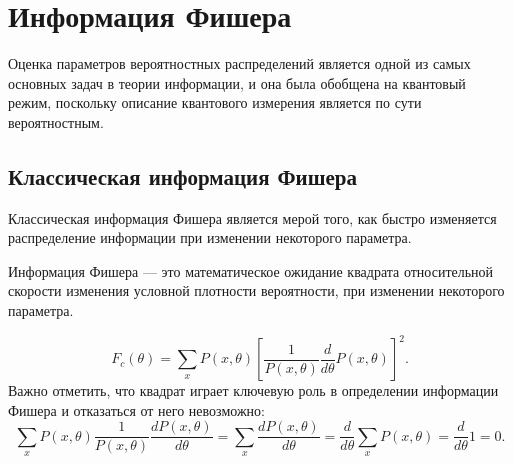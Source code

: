 \section{Информация Фишера}

Оценка параметров вероятностных распределений является одной из самых основных задач в теории информации,
и она была обобщена на квантовый режим\cite{Helstrom1969, Holevo2011}, поскольку описание квантового измерения является по сути вероятностным.

\subsection{Классическая информация Фишера}
Классическая информация Фишера является мерой того,
как быстро изменяется распределение информации при изменении некоторого параметра.

\begin{definition}\label{def:fisher-information}
 Информация Фишера --- это математическое ожидание квадрата относительной скорости изменения условной плотности вероятности,
 при изменении некоторого параметра.
\end{definition}
%
\begin{equation}\label{eq:fisher-information}
  F_c({\theta})=
      \sum_x{{P}(x,\theta)}
          \left[\frac{1}{P(x,\theta)}
     \frac{d}{d\theta}
  {P(x,\theta)}\right]^2.
\end{equation}
%
Важно отметить,
что квадрат играет ключевую роль в определении информации Фишера
и отказаться от него невозможно:
%
\begin{equation}
    \label{eq:2}
        \sum_x{{P}(x,\theta)}
            \frac{1}{P(x,\theta)}
                \frac{dP(x,\theta)}{d\theta} =
                    \sum_x\frac{{dP}(x,\theta)}{d\theta} =
                \frac{d}{d\theta}\sum_x{{P}(x,\theta)} =
            \frac{d}{d\theta}1 =
            0.
\end{equation}

